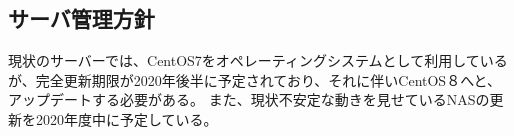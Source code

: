 \subsection*{サーバ管理方針}

現状のサーバーでは、CentOS7をオペレーティングシステムとして利用しているが、完全更新期限が2020年後半に予定されており、それに伴いCentOS８へと、アップデートする必要がある。
また、現状不安定な動きを見せているNASの更新を2020年度中に予定している。